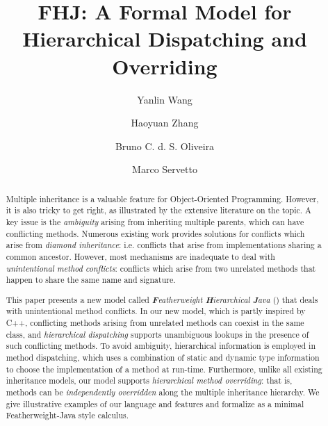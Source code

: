 \documentclass[a4paper,english]{lipics-v2018}
\title{FHJ: A Formal Model for Hierarchical Dispatching and Overriding}
\author{Yanlin Wang}
{The University of Hong Kong, China}
{ylwang@cs.hku.hk}
{}{}%
\author{Haoyuan Zhang}
{The University of Hong Kong, China}
{hyzhang@cs.hku.hk}
{}{}
\author{Bruno C. d. S. Oliveira}
{The University of Hong Kong, China}
{bruno@cs.hku.hk}
{}{}
\author{Marco Servetto}
{Victoria University of Wellington, New Zealand}
{marco.servetto@ecs.vuw.ac.nz}
{}{}
\begin{document}
\maketitle

\begin{abstract}
Multiple inheritance is a valuable feature for Object-Oriented
Programming. However, it is also tricky to get right, as illustrated by
the extensive literature on the topic. A key issue 
is the \emph{ambiguity} arising from inheriting multiple parents,
which can have conflicting methods. 
Numerous existing work provides solutions for 
conflicts which arise from \emph{diamond inheritance}: i.e.
conflicts that arise from implementations sharing a common 
ancestor. However, most mechanisms are inadequate to deal 
with \emph{unintentional method conflicts}: conflicts which 
arise from two unrelated methods that happen to share the same name
and signature. 

This paper presents a new model called \emph{\textbf{F}eatherweight
  \textbf{H}ierarchical \textbf{J}ava} (\name{}) that deals with
unintentional method conflicts.  In our new model, which is partly
inspired by C++, conflicting methods arising from unrelated methods
can coexist in the same class, and \emph{hierarchical dispatching}
supports unambiguous lookups in the presence of such conflicting
methods.  To avoid ambiguity, hierarchical information is employed in
method dispatching, which uses a combination of static and dynamic
type information to choose the implementation of a method at run-time.
Furthermore, unlike all existing inheritance models, our model
supports \emph{hierarchical method overriding}: that is, methods can
be \emph{independently overridden} along the multiple inheritance
hierarchy. We give illustrative examples of our language and features
and formalize \name{} as a minimal Featherweight-Java style calculus.
\end{abstract}











\newpage
\appendix

\end{document}

